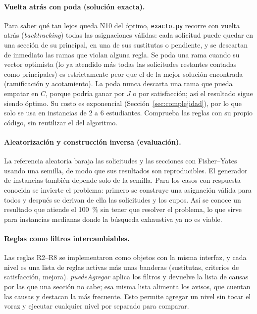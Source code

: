 \paragraph{Vuelta atrás con poda (solución exacta).} Para saber qué tan lejos queda N10 del óptimo, \texttt{exacto.py} recorre con vuelta atrás (\emph{backtracking}) todas las asignaciones válidas: cada solicitud puede quedar en una sección de su principal, en una de sus sustitutas o pendiente, y se descartan de inmediato las ramas que violan alguna regla. Se poda una rama cuando su vector optimista (lo ya atendido más todas las solicitudes restantes contadas como principales) es estrictamente peor que el de la mejor solución encontrada (ramificación y acotamiento). La poda nunca descarta una rama que pueda empatar en $C$, porque podría ganar por $J$ o por satisfacción; así el resultado sigue siendo óptimo. Su costo es exponencial (Sección~\ref{sec:complejidad}), por lo que solo se usa en instancias de 2 a 6 estudiantes. Comprueba las reglas con su propio código, sin reutilizar el del algoritmo.

\paragraph{Aleatorización y construcción inversa (evaluación).} La referencia aleatoria baraja las solicitudes y las secciones con Fisher--Yates usando una semilla, de modo que sus resultados son reproducibles. El generador de instancias también depende solo de la semilla. Para los casos con respuesta conocida se invierte el problema: primero se construye una asignación válida para todos y después se derivan de ella las solicitudes y los cupos. Así se conoce un resultado que atiende el 100~\% sin tener que resolver el problema, lo que sirve para instancias medianas donde la búsqueda exhaustiva ya no es viable.

\paragraph{Reglas como filtros intercambiables.} Las reglas R2--R8 se implementaron como objetos con la misma interfaz, y cada nivel es una lista de reglas activas más unas banderas (sustitutas, criterios de satisfacción, mejora). \emph{puedeAgregar} aplica los filtros y devuelve la lista de causas por las que una sección no cabe; esa misma lista alimenta los avisos, que cuentan las causas y destacan la más frecuente. Esto permite agregar un nivel sin tocar el voraz y ejecutar cualquier nivel por separado para comparar.

